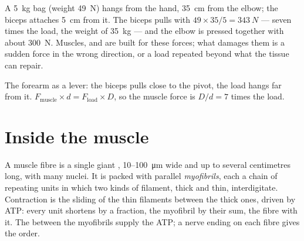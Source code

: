 \begin{example}\label{ex:g10:muscles-and-joints:bag}
A \qty{5}{kg} bag (weight \qty{49}{N}) hangs from the hand,
\qty{35}{cm} from the elbow; the biceps  attaches \qty{5}{cm}
from it. The biceps pulls with $49 \times 35/5 = \qty{343}{N}$ ---
seven times the load, the weight of \qty{35}{kg} --- and the elbow
 is pressed together with about \qty{300}{N}. Muscles, 
and  are built for these forces; what damages them is a
sudden force in the wrong direction, or a load repeated beyond what
the tissue can repair.
\end{example}

\begin{omfigure}

{\small The forearm as a lever: the biceps pulls close to the pivot,
the load hangs far from it. $F_{\text{muscle}} \times d =
F_{\text{load}} \times D$, so the muscle force is $D/d = 7$ times the
load.}
\end{omfigure}

\section{Inside the muscle}

\begin{proposition}\label{prop:g10:muscles-and-joints:fibre}
A muscle fibre is a single giant , \num{10}--\qty{100}{\micro m}
wide and up to several centimetres long, with many nuclei. It is
packed with parallel \emph{myofibrils}, each a chain of repeating
units in which two kinds of  filament, thick and thin,
interdigitate. Contraction is the sliding of the thin filaments
between the thick ones, driven by ATP: every unit shortens by a
fraction, the myofibril by their sum, the fibre with it. The
 between the myofibrils supply the ATP; a nerve ending on
each fibre gives the order.
\end{proposition}
\admitted

